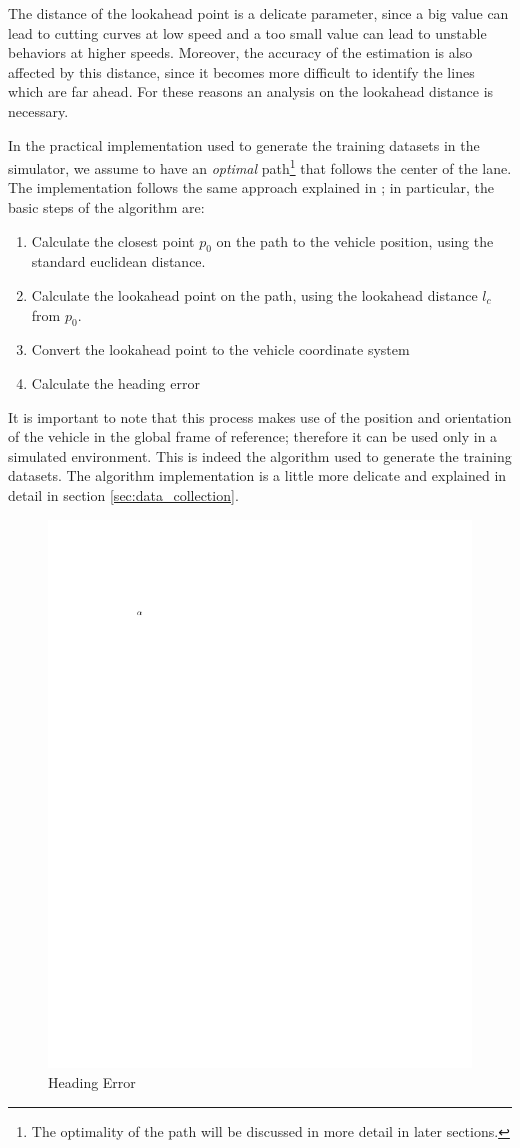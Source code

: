 \documentclass[a4paper,12pt,sort&compress]{article}
\begin{document}
    The distance of the lookahead point
    is a delicate parameter, since a big value can lead to cutting curves at low
    speed and a too small value can lead to unstable behaviors at higher speeds.
    Moreover, the accuracy of the estimation is also affected by this distance,
    since it becomes more difficult to identify the lines which are far ahead.
    For these reasons an analysis on the lookahead distance is necessary. 

    In the practical implementation used to generate the training datasets in
    the simulator, we assume to have an \textit{optimal} path\footnote{The optimality of the path will be discussed in
    more detail in later sections.} that follows the center of the lane. The
    implementation follows the same approach explained in
    \citep*{coulter1992implementation}; in particular, the basic steps of the
    algorithm are:
    \begin{enumerate}
        \item Calculate the closest point $p_0$ on the path to the vehicle position,
        using the standard euclidean distance.
        \item Calculate the lookahead point on the path, using the lookahead
        distance $l_c$ from $p_0$.
        \item Convert the lookahead point to the vehicle coordinate system
        \item Calculate the heading error
    \end{enumerate}
    It is important to note that this process makes use of the position and
    orientation of the vehicle in the global frame of reference; therefore it
    can be used only in a simulated environment. This is indeed the algorithm
    used to generate the training datasets. The algorithm implementation is a little more delicate
    and explained in detail in section \ref{sec:data_collection}.

    \begin{figure}
        \centering
        \includegraphics[width=0.6\linewidth]{a.pdf}
        \caption{Heading Error}
        \label{fig:heading_error}
    \end{figure}
\end{document}

